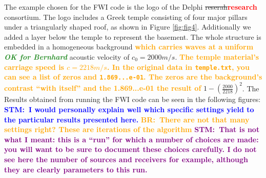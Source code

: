 \documentclass[10pt,a4paper]{article}
\newcommand{\commentstm}[1]{\textcolor{blue}{\textbf{STM:\ #1}}}
\newcommand{\commentstmtwo}[1]{\textcolor{purple}{\textbf{STM:\ #1}}}
\newcommand{\newstm}[1]{\textcolor{red}{\textbf{#1}}}
\newcommand{\newstmtwo}[1]{\textcolor{orange}{\textbf{#1}}}
\newcommand{\oldstm}[1]{\sout{#1}}
\newcommand{\oldstmtwo}[1]{\xout{#1}}
\newcommand{\brok}{\textcolor{ForestGreen}{\textit{\textbf{OK for Bernhard}}}}
\newcommand{\commentbr}[1]{\textcolor{orange}{\textbf{BR:\ #1}}}
\begin{document}
The example chosen for the FWI code is the logo of the Delphi
\oldstm{reserah}\newstm{research} consortium. The logo includes a
Greek temple consisting of four major
pillars under a triangularly shaped roof, as shown in Figure \ref{fig:fig4}.
Additionally we added a layer below the temple to represent the
basement. The whole structure is embedded in a homogeneous background
\oldstmtwo{with a} \newstmtwo{which carries waves at a}
\oldstmtwo{constant} \newstmtwo{uniform} {\brok} acoustic velocity of
$c_0 = 2000 m/s$.
\newstmtwo{The temple material's carriage speed is $c = 2218 m/s$.
In the original data in \texttt{temple.txt}, you can see a list of
zeros and \texttt{1.869...e-01}. The zeros are the background's
contrast ``with itself'' and the 1.869...e-01 the result of} $1-
{(\frac{2000}{2218})}^2$.
The Results obtained from running the FWI code can be seen in the
following figures:
\commentstm{I would personally explain well which specific settings
yield to the particular results presented here.}
\commentbr{There are not that many settings right? These are
iterations of the algorithm}
\commentstmtwo{That is not what I meant: this is a ``run'' for which a
number of choices are made: you will want to be sure to document these
choices carefully. I do not see here the number of sources and
receivers for example, although they are clearly parameters to this
run.}
\end{document}
